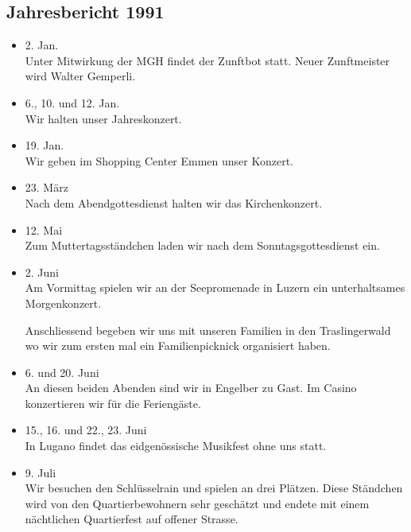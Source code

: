 \subsection{Jahresbericht 1991}

\begin{history}


    \begin{itemize}

        \item[]2. Jan.\\
        Unter Mitwirkung der MGH findet der Zunftbot statt. Neuer Zunftmeister
        wird Walter Gemperli.

        \item[]6., 10. und 12. Jan.\\
        Wir halten unser Jahreskonzert.

        \item[]19. Jan.\\
        Wir geben im Shopping Center Emmen unser Konzert.

        \item[]23. März\\
        Nach dem Abendgottesdienst halten wir das Kirchenkonzert.

        \item[]12. Mai\\
        Zum Muttertagsständchen laden wir nach dem Sonntagsgottesdienst ein.

        \item[]2. Juni\\
        Am Vormittag spielen wir an der Seepromenade in Luzern ein
        unterhaltsames Morgenkonzert.

        Anschliessend begeben wir uns mit unseren Familien in den Traslingerwald
        wo wir zum ersten mal ein Familienpicknick organisiert haben.

        \item[]6. und 20. Juni\\
        An diesen beiden Abenden sind wir in Engelber zu Gast. Im Casino
        konzertieren wir für die Feriengäste.

        \item[]15., 16. und 22., 23. Juni\\
        In Lugano findet das eidgenössische Musikfest ohne uns statt.

        \item[]9. Juli\\
        Wir besuchen den Schlüsselrain und spielen an drei Plätzen. Diese
        Ständchen wird von den Quartierbewohnern sehr geschätzt und endete mit
        einem nächtlichen Quartierfest auf offener Strasse.


\end{itemize}
\end{history}
